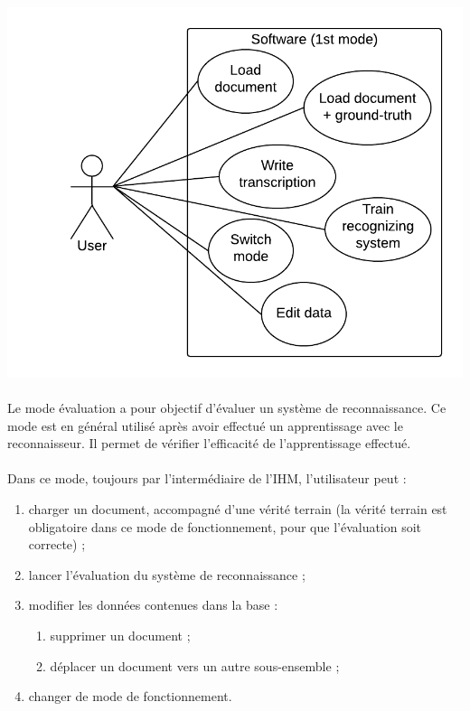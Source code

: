 \paragraph{}

\begin{mdframed}[frametitle={Figure 2 : Diagramme de cas d'utilisation (mode apprentissage)}, innerbottommargin=10]
\begin{center}
\includegraphics[scale=0.6]{Usecase_1.png}
\end{center}
\end{mdframed}

\paragraph{}

Le mode évaluation a pour objectif d’évaluer un système de reconnaissance. Ce
mode est en général utilisé après avoir effectué un apprentissage avec le
reconnaisseur. Il permet de vérifier l’efficacité de l’apprentissage effectué.

\paragraph{}

Dans ce mode, toujours par l’intermédiaire de l’IHM, l’utilisateur peut :
\begin{enumerate}
\item charger un document, accompagné d’une vérité terrain (la vérité terrain
est obligatoire dans ce mode de fonctionnement, pour que l’évaluation soit
correcte) ;
\item lancer l’évaluation du système de reconnaissance ;
\item modifier les données contenues dans la base :
\begin{enumerate}
\item supprimer un document ;
\item déplacer un document vers un autre sous-ensemble ;
\end{enumerate}
\item changer de mode de fonctionnement.
\end{enumerate}

